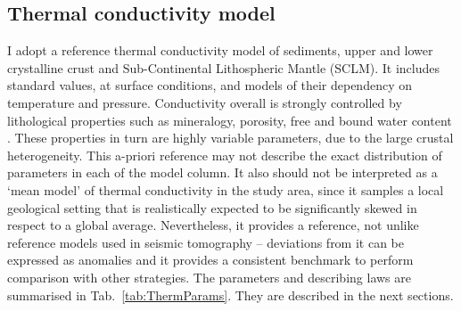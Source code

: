 \subsection{Thermal conductivity model}
\label{ss:Appl:ThermCond}
I adopt a reference thermal conductivity model of sediments, upper and lower crystalline crust and Sub-Continental Lithospheric Mantle (SCLM).
It includes standard values, at surface conditions, and models of their dependency on temperature and pressure.
Conductivity overall is strongly controlled by lithological properties such as mineralogy, porosity, free and bound water content \parencites{allen2013basin}{schon2011handbook}.
These properties in turn are highly variable parameters, due to the large crustal heterogeneity.
This a-priori reference may not describe the exact distribution of parameters in each of the model column.
It also should not be interpreted as a `mean model' of thermal conductivity in the study area, since it samples a local geological setting that is realistically expected to be significantly skewed in respect to a global average.
Nevertheless, it provides a reference, not unlike reference models used in seismic tomography -- deviations from it can be expressed as anomalies and it provides a consistent benchmark to perform comparison with other strategies.
The parameters and describing laws are summarised in Tab.~\ref{tab:ThermParams}.
They are described in the next sections.


